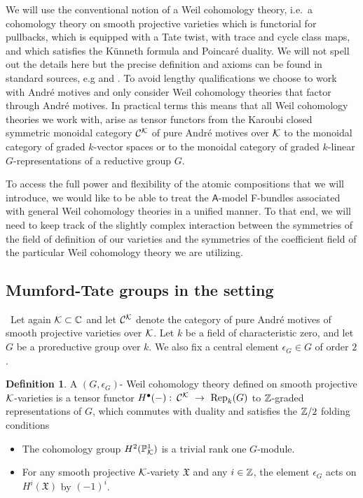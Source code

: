\documentclass[twoside,leqno]{article}
\numberwithin{equation}{section}
\theoremstyle{plain}
\theoremstyle{definition}
\newtheorem{definition}[equation]{Definition}
\begin{document}
We will use the conventional notion of a Weil cohomology theory, i.e.\ a cohomology theory on smooth projective varieties which is functorial for pullbacks, which is equipped with a Tate twist, with trace and cycle class maps, and which satisfies the K\"{u}nneth formula and Poincar\'{e} duality. We will not spell out the details here but the precise definition and axioms can be found in standard sources, e.g \cite[Definition~1.2.13]{murre} and \cite[Chapter~45,tag~0FFG]{stacksproject}.  To avoid lengthy qualifications we choose to work with Andr\'{e} motives and only consider Weil cohomology theories that factor through Andr\'{e} motives. In practical terms this means that all Weil cohomology theories we work with, arise as tensor functors from the Karoubi closed symmetric monoidal category $\mathcal{C}^{\mathcal K}$ of pure Andr\'{e} motives over $\mathcal K$ to the monoidal category of graded $k$-vector spaces or to the monoidal category of graded $k$-linear $G$-representations of a reductive group $G$.

To access the full power and flexibility of the atomic compositions that we will introduce, we would like  to be able to treat the $\mathsf{A}$-model F-bundles associated with general Weil cohomology theories in a unified manner. To that end, we will need to keep track of the slightly complex
interaction between the symmetries of the field of definition  of our varieties and the symmetries of the coefficient field of the particular Weil cohomology theory we are  utilizing.

\subsection{Mumford-Tate groups in the \texorpdfstring{\nc}{nc} setting} \label{ssec:MTnc} \ 
Let again $\mathcal K \subset \mathbb C$ and let $\mathcal{C}^{\mathcal K}$ denote the category of pure Andr\'{e} motives of smooth projective varieties over $\mathcal K$. Let $k$ be a field of characteristic zero, and 
let $G$ be a proreductive group over $k$. We  also fix a central element $\epsilon_{G} \in G$ of order $2$.

\begin{definition}  \label{def:MTsymmetry} 
A  $(G,\epsilon_{G})$-  Weil cohomology theory defined on smooth projective $\mathcal K$-varieties is a tensor functor $H^{\bullet}(-) \, \colon \, \CA{\kay} \ \to \ \Rep_{k}(G)$
to $\mathbb Z$-graded representations of $G$, which commutes with duality and satisfies the $\mathbb Z/2$ folding 
conditions
\begin{itemize}
    \item The cohomology group $H^2(\mathbb P^1_{\mathcal K})$ is a trivial rank one  $G$-module.
    \item For any smooth projective $\mathcal K$-variety $\mathfrak{X}$ and any $i \in \mathbb Z$, the element $\epsilon_{G}$ acts on $H^i(\mathfrak{X})$ by $(-1)^i$.
\end{itemize}
\end{definition}
\end{document}
